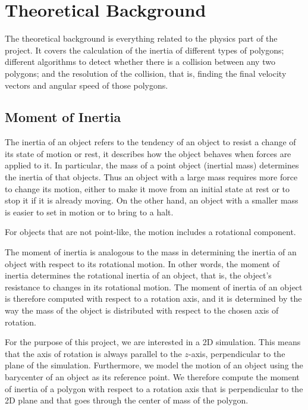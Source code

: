 \section{Theoretical Background}
\label{sec:theory}
The theoretical background is everything related to the physics part of the
project. It covers the calculation of the inertia of different types of polygons;
different algorithms to detect whether there is a collision between
any two polygons; and the resolution of the collision, that is, finding the final
velocity vectors and angular speed of those polygons.

\subsection{Moment of Inertia}
\label{sub:moment}

The inertia of an object refers to the tendency of an object to resist
a change of its state of motion or rest, it describes how the object
behaves when forces are applied to it. In particular, the mass of a
point object (inertial mass) determines the inertia of that objects.
Thus an object with a large mass requires more force to change its
motion, either to make it move from an initial state at rest or to
stop it if it is already moving. On the other hand, an object with a
smaller mass is easier to set in motion or to bring to a halt.

For objects that are not point-like, the motion includes a rotational
component.

The moment of inertia is analogous to the mass in determining the
inertia of an object with respect to its rotational motion. In other
words, the moment of inertia determines the rotational inertia of an
object, that is, the object's resistance to changes in its rotational
motion.  The moment of inertia of an object is therefore computed with
respect to a rotation axis, and it is determined by the way the mass
of the object is distributed with respect to the chosen axis of
rotation.


For the purpose of this project, we are interested in a 2D simulation.
This means that the axis of rotation is always parallel to the
$z$-axis, perpendicular to the plane of the simulation.  Furthermore,
we model the motion of an object using the barycenter of an object as
its reference point.  We therefore compute the moment of inertia of a
polygon with respect to a rotation axis that is perpendicular to the
2D plane and that goes through the center of mass of the polygon.

